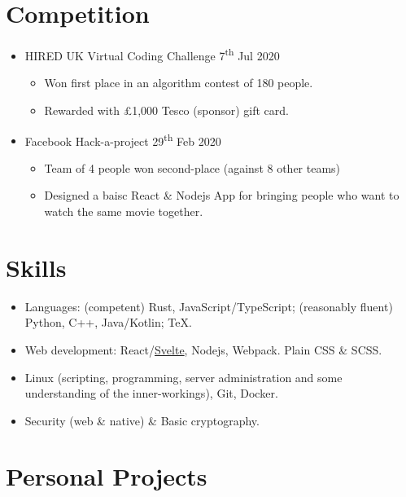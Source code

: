   \section{Competition}

  \begin{itemize}
    \item HIRED \dashdiv{} UK Virtual Coding Challenge \dashdiv{} 7\textsuperscript{th} Jul 2020
    \begin{itemize}
      \item Won first place in an algorithm contest of 180 people.
      \item Rewarded with £1,000 Tesco (sponsor) gift card.
    \end{itemize}
    \item Facebook \dashdiv{} Hack-a-project \dashdiv{} 29\textsuperscript{th} Feb 2020
    \begin{itemize}
      \item Team of 4 people won second-place (against 8 other teams)
      \item Designed a baisc React \& Nodejs App  for bringing people who want to watch the same movie together.
    \end{itemize}
  \end{itemize}

  \section{Skills}

  \begin{itemize}[itemsep=0.1\parskip]
    \item Languages: (competent) Rust, JavaScript/TypeScript; (reasonably fluent) Python, C++, Java/Kotlin; \TeX.

    \item Web development: React/\href{https://svelte.dev/}{\color{link}Svelte}, Nodejs, Webpack. Plain CSS \& SCSS.

    \item Linux (scripting, programming, server administration and some understanding of the inner-workings), Git, Docker. %

    \item Security (web \& native) \& Basic cryptography.

  \end{itemize}

  \section{Personal Projects}

